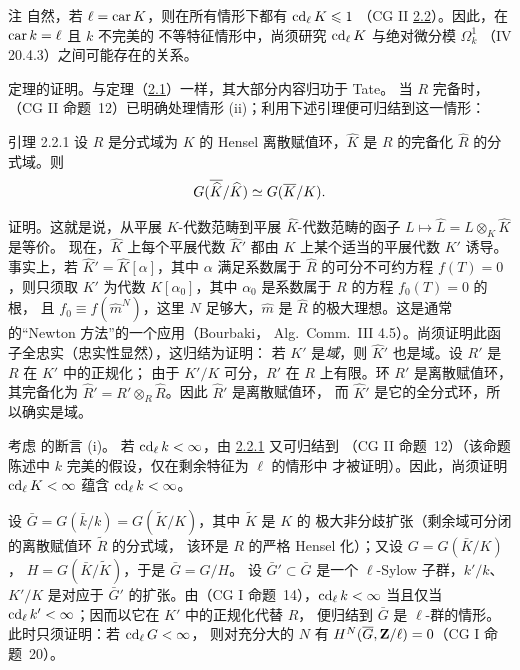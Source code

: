 \begin{enonce*}[remark]{注}
自然，若 $\ell=\operatorname{car} K$，则在所有情形下都有 $\operatorname{cd}_{\ell}K\leqslant 1$
（CG II \hyperref[X.thm2.2]{2.2}）。因此，在 $\operatorname{car} k=\ell$ 且 $k$ 不完美的
不等特征情形中，尚须研究 $\operatorname{cd}_{\ell}K$ 与绝对微分模 $\Omega^1_k$
（\EGA IV 20.4.3）之间可能存在的关系。
\end{enonce*}

定理的证明。与定理（\hyperref[X.thm2.1]{2.1}）一样，其大部分内容归功于 Tate。
当 $R$ 完备时，（CG II 命题~12）已明确处理情形 (ii)；利用下述引理便可归结到这一情形：

\begin{enonce*}{引理 2.2.1}
设 $R$ 是分式域为 $K$ 的 Hensel 离散赋值环，$\widehat{K}$ 是 $R$ 的完备化
$\widehat{R}$ 的分式域。则
$$
G(\overline{\widehat{K}}/\widehat{K})\simeq G(\overline{K}/K){}.
$$
\end{enonce*}

证明。这就是说，从\pageoriginale 平展 $K$-代数范畴到平展 $\widehat{K}$-代数范畴的函子
$L\mapsto \widehat{L}=L\otimes_K \widehat{K}$ 是等价。
现在，$\widehat{K}$ 上每个平展代数 $\widehat{K}'$ 都由 $K$ 上某个适当的平展代数
$K'$ 诱导。事实上，若 $\widehat{K}'=\widehat{K}[\alpha]$，其中 $\alpha$
满足系数属于 $\widehat{R}$ 的可分不可约方程 $f(T)=0$，则只须取
$K'$ 为代数 $K[\alpha_0]$，其中 $\alpha_0$ 是系数属于 $R$ 的方程 $f_0(T)=0$ 的根，
且 $f_0\equiv f(\widehat{m}^N)$，这里 $N$ 足够大，$\widehat{m}$ 是
$\widehat{R}$ 的极大理想。这是通常的“Newton 方法”的一个应用（Bourbaki，
Alg.~Comm.~III 4.5）。尚须证明此函子全忠实（忠实性显然），这归结为证明：
若 $K'$ 是\emph{域}，则 $\widehat{K}'$ 也是域。设 $R'$ 是 $R$ 在 $K'$ 中的正规化；
由于 $K'/K$ 可分，$R'$ 在 $R$ 上有限。环 $R'$ 是离散赋值环，其完备化为
$\widehat{R}'=R'\otimes_R \widehat{R}$。因此 $\widehat{R}'$ 是离散赋值环，
而 $\widehat{K}'$ 是它的全分式环，所以确实是域。

考虑  的断言 (i)。
若 $\operatorname{cd}_{\ell}k<\infty$，由 \hyperref[X.lem2.2.1]{2.2.1} 又可归结到
（CG II 命题~12）（该命题陈述中 $k$ 完美的假设，仅在剩余特征为 $\ell$ 的情形中
才被证明）。因此，尚须证明 $\operatorname{cd}_{\ell}K<\infty$ 蕴含
$\operatorname{cd}_{\ell}k<\infty$。

设 $\bar{G}=G(\bar{k}/k)=G(\widetilde{K}/K)$，其中 $\widetilde{K}$ 是 $K$ 的
极大非分歧扩张（\ie 剩余域可分闭的离散赋值环 $\widetilde{R}$ 的分式域，
该环是 $R$ 的严格 Hensel 化）；又设 $G=G(\bar{K}/K)$，
$H=G(\bar{K}/\widetilde{K})$，于是 $\bar{G}=G/H$。
设 $\bar{G}'\subset \bar{G}$ 是一个 $\ell$-Sylow 子群，$k'/k$、$K'/K$
是对应于 $\bar{G}'$ 的扩张。由（CG I 命题~14），$\operatorname{cd}_{\ell}k<\infty$
当且仅当 $\operatorname{cd}_{\ell}k'<\infty$；因而以它在 $K'$ 中的正规化代替 $R$，
便归结到 $\bar{G}$ 是 $\ell$-群的情形。此时只须证明：若 $\operatorname{cd}_{\ell}G<\infty$，
则对充分大的 $N$ 有 $H^N(\overline{G},\mathbf{Z}/\ell)=0$（CG I 命题~20）。

